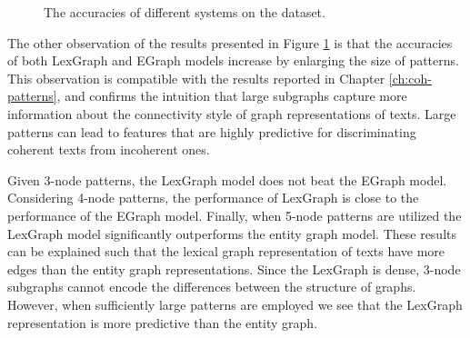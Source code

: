 \begin{figure}[!ht]
  \begin{center}
    \mydata
\end{center}
  \caption{The accuracies of different systems on the \pitlerds dataset.}
  \label{fig:pitler-ds}
\end{figure}

The other observation of the results presented in Figure \ref{fig:pitler-ds} is that the accuracies of both \mbox{LexGraph} and EGraph models increase by enlarging the size of patterns.  
This observation is compatible with the results reported in Chapter \ref{ch:coh-patterns}, and confirms the intuition that large subgraphs capture more information about the connectivity style of graph representations of texts.
Large patterns can lead to features that are highly predictive for discriminating coherent texts from incoherent ones. 

Given 3-node patterns, the LexGraph model does not beat the EGraph model. 
Considering \mbox{4-node} patterns, the performance of LexGraph is close to the performance of the EGraph model. 
Finally, when 5-node patterns are utilized the LexGraph model significantly outperforms the entity graph model. 
These results can be explained such that the lexical graph representation of texts have more edges than the entity graph representations. 
Since the LexGraph is dense, 3-node subgraphs cannot encode the differences between the structure of graphs. 
However, when sufficiently large patterns are employed we see that the LexGraph representation is more predictive than the entity graph.   

